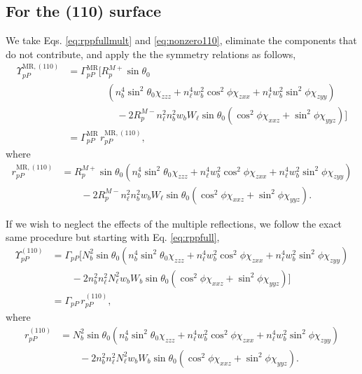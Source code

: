 \subsection{For the (110) surface}

We take Eqs. \eqref{eq:rppfullmult} and \eqref{eq:nonzero110}, eliminate the
components that do not contribute, and apply the the symmetry relations as
follows,
\begin{equation*}
\begin{split}
\Upsilon^{\mathrm{MR},(110)}_{pP} &=
\Gamma^{\mathrm{MR}}_{pP}
\big[
R^{M+}_{p}\sin\theta_{0}\\
&\qquad\qquad(n^{4}_{b}\sin^{2}\theta_{0}\chi_{zzz} 
 + n^{4}_{\ell}w^{2}_{b}\cos^{2}\phi\chi_{zxx}
 + n^{4}_{\ell}w^{2}_{b}\sin^{2}\phi\chi_{zyy})\\
&\qquad\qquad\quad- 2R^{M-}_{p}n^{2}_{\ell}n^{2}_{b}w_{b}W_{\ell}\sin\theta_{0}
 (\cos^{2}\phi\chi_{xxz} + \sin^{2}\phi\chi_{yyz})
\big]\\
&= \Gamma^{\mathrm{MR}}_{pP}\,r^{\mathrm{MR},(110)}_{pP},
\end{split}
\end{equation*}
where
\begin{equation}
\boxed{
\begin{split}
r^{\mathrm{MR},(110)}_{pP} &= 
R^{M+}_{p}\sin\theta_{0}(n^{4}_{b}\sin^{2}\theta_{0}\chi_{zzz} 
 + n^{4}_{\ell}w^{2}_{b}\cos^{2}\phi\chi_{zxx}
 + n^{4}_{\ell}w^{2}_{b}\sin^{2}\phi\chi_{zyy})\\
&\qquad- 2R^{M-}_{p}n^{2}_{\ell}n^{2}_{b}w_{b}W_{\ell}\sin\theta_{0}
 (\cos^{2}\phi\chi_{xxz} + \sin^{2}\phi\chi_{yyz}).
\end{split}
}
\end{equation}

If we wish to neglect the effects of the multiple reflections, we follow the
exact same procedure but starting with Eq. \eqref{eq:rppfull},
\begin{equation*}
\begin{split}
\Upsilon^{(110)}_{pP} &=
\Gamma_{pP}
\big[
N^{2}_{b}\sin\theta_{0}(n^{4}_{b}\sin^{2}\theta_{0}\chi_{zzz}
 + n^{4}_{\ell}w^{2}_{b}\cos^{2}\phi\chi_{zxx}
 + n^{4}_{\ell}w^{2}_{b}\sin^{2}\phi\chi_{zyy})\\
&\qquad- 2n^{2}_{b}n^{2}_{\ell}N^{2}_{\ell}w_{b}W_{b}\sin\theta_{0}
(\cos^{2}\phi\chi_{xxz} + \sin^{2}\phi\chi_{yyz})
\big]\\
&= \Gamma_{pP}\,r^{(110)}_{pP},
\end{split}
\end{equation*}
where
\begin{equation}
\boxed{
\begin{split}
r^{(110)}_{pP} &= 
N^{2}_{b}\sin\theta_{0}(n^{4}_{b}\sin^{2}\theta_{0}\chi_{zzz}
 + n^{4}_{\ell}w^{2}_{b}\cos^{2}\phi\chi_{zxx}
 + n^{4}_{\ell}w^{2}_{b}\sin^{2}\phi\chi_{zyy})\\
&\qquad- 2n^{2}_{b}n^{2}_{\ell}N^{2}_{\ell}w_{b}W_{b}\sin\theta_{0}
(\cos^{2}\phi\chi_{xxz} + \sin^{2}\phi\chi_{yyz}).
\end{split}
}
\end{equation}


